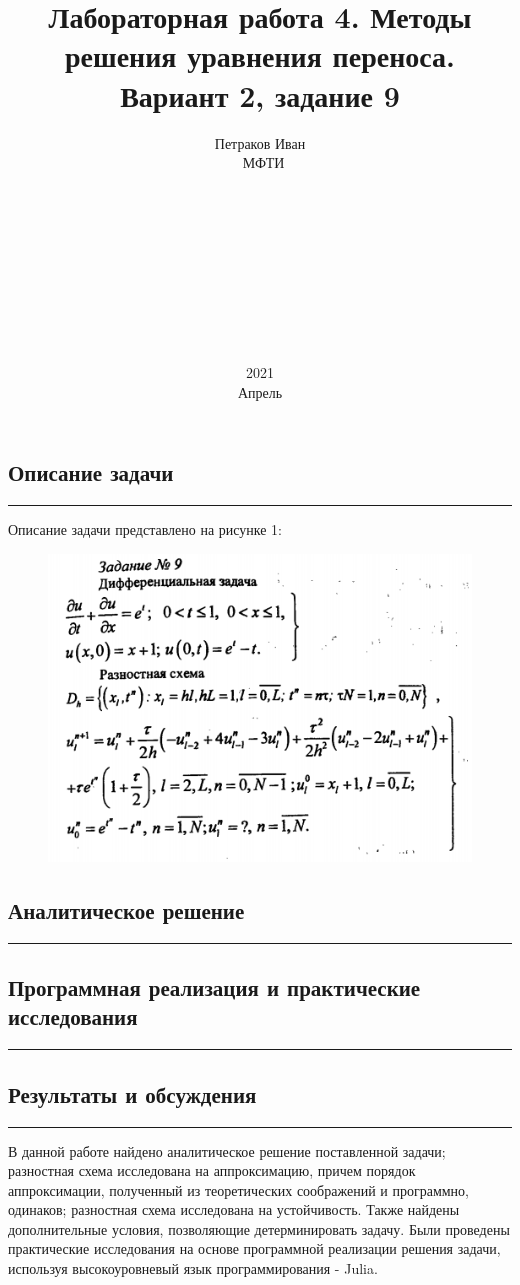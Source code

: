 \documentclass[12pt,a4paper, titlepage]{article}
\title{Лабораторная работа 4. Методы решения уравнения переноса. Вариант 2, задание 9}
\date{2021\\Апрель}
\author{Петраков Иван\\\ МФТИ\\\\\\\\\\\\\\\\\\\\}
\begin{document}
\maketitle

\subsection*{Описание задачи}
\noindent\rule{\textwidth}{1pt}
Описание задачи представлено на рисунке 1:
\begin{figure}[H]
	\centering
	\includegraphics[width = 1.0\textwidth]{lab4_1.png}
\end{figure}

\subsection*{Аналитическое решение}
\noindent\rule{\textwidth}{1pt}



\subsection*{Программная реализация и практические исследования}
\noindent\rule{\textwidth}{1pt}

\subsection*{Результаты и обсуждения}
\noindent\rule{\textwidth}{1pt}
В данной работе найдено аналитическое решение поставленной задачи; разностная схема исследована на аппроксимацию, причем порядок аппроксимации, полученный из теоретических соображений и программно, одинаков; разностная схема исследована на устойчивость. Также найдены дополнительные условия, позволяющие детерминировать задачу. Были проведены практические исследования на основе программной реализации решения задачи, используя высокоуровневый язык программирования - Julia.
\end{document}
